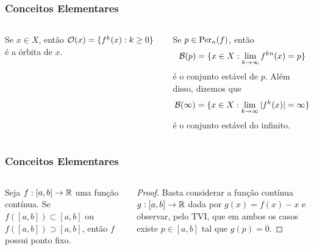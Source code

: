 
\begin{frame} 
\vspace{5pt}
\frametitle{Conceitos Elementares}
\begin{columns}
\column{\dimexpr\paperwidth-15pt}

\begin{definition}
Se $x \in X$, então $\mathcal{O}(x) = \lbrace f^k(x) : k \geq 0 \rbrace$ é a órbita de $x$.
\end{definition}

\begin{definition} 
Se $p \in \operatorname{Per}_n(f)$, então
$$\mathcal{B}(p) = \lbrace x \in  X: \lim_{k \to \infty} f^{kn}(x) = p \rbrace$$
é o conjunto estável de $p$. Além disso, dizemos que
$$\mathcal{B}(\infty) = \lbrace x \in  X: \lim_{k \to \infty} |f^k(x)| = \infty \rbrace$$
é o conjunto estável do infinito.
\end{definition}

\end{columns}
\end{frame}


\begin{frame}
\vspace{5pt}
\frametitle{Conceitos Elementares}
\begin{columns}
\column{\dimexpr\paperwidth-15pt}

\begin{proposition}
Seja $f: [a, b] \to \mathbb{R}$ uma função contínua. Se $f([a, b]) \subset [a, b]$ ou $f([a, b]) \supset [a, b]$, então $f$ possui ponto fixo.
\end{proposition}

\begin{proof}
Basta considerar a função contínua $g: [a, b] \to \mathbb{R}$ dada por $g(x) = f(x) - x$ e observar, pelo TVI, que em ambos os casos existe $p \in [a, b]$ tal que $g(p) = 0$.
\end{proof}

\end{columns}
\end{frame}



